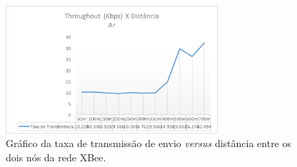 \begin{figure} 
\center
\includegraphics[width=0.7\textwidth]{throughputResultAr.png}
\caption{Gráfico da taxa de transmissão de envio \emph{versus} distância entre os dois nós da rede XBee.} 
\label{fig:ThroughputAr}
\end{figure}










